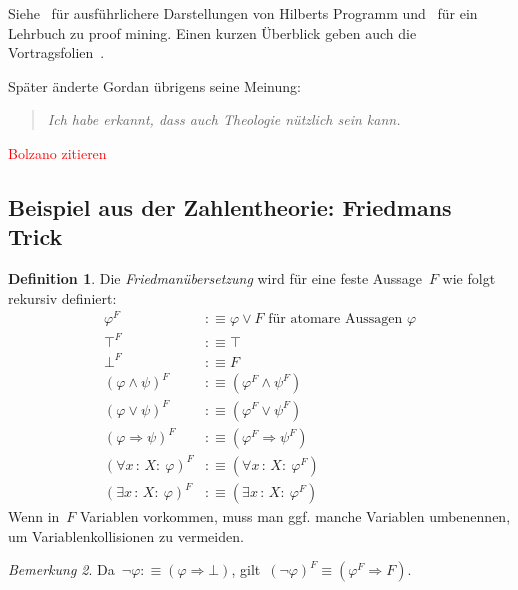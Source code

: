 \documentclass[a4paper,ngerman,12pt]{scrartcl}
\theoremstyle{definition}
\newtheorem{defn}{Definition}[section]
\theoremstyle{plain}
\theoremstyle{remark}
\newtheorem{bem}[defn]{Bemerkung}
\renewcommand{\_}{\mathpunct{.}\,}
\newcommand{\?}{\,{:}\,}
\newcommand{\XXX}[1]{\textcolor{red}{#1}}
\begin{document}
Siehe~\cite{plato:hilbert,zach:hilbert,raatikainen:hilbert} für ausführlichere
Darstellungen von
Hilberts Programm und~\cite{kohlenbach:applprooftheory} für ein Lehrbuch zu
proof mining. Einen kurzen Überblick geben auch die
Vortragsfolien~\cite{avigad:proofmining}.

Später änderte Gordan übrigens seine Meinung:
\begin{quote}
\emph{Ich habe erkannt, dass auch Theologie nützlich sein kann.}
\end{quote}

\XXX{Bolzano zitieren}

\subsection{Beispiel aus der Zahlentheorie: Friedmans Trick}

\label{sect:friedman}%
\begin{defn}Die \emph{Friedmanübersetzung}
wird für eine feste Aussage~$F$ wie folgt rekursiv definiert:
\begin{align*}
  \varphi^F &:\equiv \varphi \vee F \text{ für atomare Aussagen~$\varphi$} \\
  \top^F &:\equiv \top \\
  \bot^F &:\equiv F \\
  (\varphi \wedge \psi)^F &:\equiv (\varphi^F \wedge \psi^F) \\
  (\varphi \vee \psi)^F &:\equiv (\varphi^F \vee \psi^F) \\
  (\varphi \Rightarrow \psi)^F &:\equiv (\varphi^F \Rightarrow \psi^F) \\
  (\forall x\?X{:}\ \varphi)^F &:\equiv (\forall x\?X{:}\ \varphi^F) \\
  (\exists x\?X{:}\ \varphi)^F &:\equiv (\exists x\?X{:}\ \varphi^F)
\end{align*}
Wenn in~$F$ Variablen vorkommen, muss man ggf. manche Variablen umbenennen, um
Variablenkollisionen zu vermeiden.
\end{defn}

\begin{bem}Da~$\neg\varphi :\equiv (\varphi \Rightarrow \bot)$,
gilt~$(\neg\varphi)^F \equiv (\varphi^F \Rightarrow F)$.\end{bem}
\end{document}
